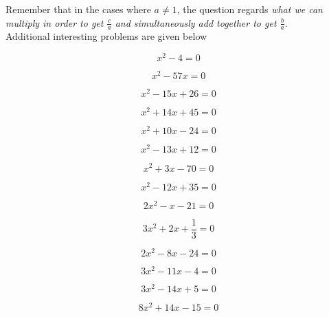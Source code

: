 \documentclass[a4paper]{article}
\begin{document}
Remember that in the cases where $a \neq 1$, the question regards \emph{what we can multiply in order to get $\frac{c}{a}$ and simultaneously add together to get $\frac{b}{a}$}.
\\Additional interesting problems are given below

\begin{equation}
	x^2 - 4 = 0
\end{equation}

\begin{equation}
	x^2 - 57x = 0
\end{equation}

\begin{equation}
	x^2 - 15x +26 = 0
\end{equation}

\begin{equation}
	x^2 + 14x +45 = 0
\end{equation}

\begin{equation}
	x^2 + 10x -24 = 0
\end{equation}

\begin{equation}
	x^2 - 13x +12 = 0
\end{equation}

\begin{equation}
	x^2 + 3x -70 = 0
\end{equation}

\begin{equation}
	x^2 -12x +35 = 0
\end{equation}

\begin{equation}
	2x^2 -x -21 = 0
\end{equation}

\begin{equation}  \label{eq:ex5}
	3x^2 + 2x + \frac{1}{3} = 0
\end{equation}

\begin{equation}
	2x^2 -8x -24 = 0
\end{equation}

\begin{equation}
	3x^2 -11x -4 = 0
\end{equation}

\begin{equation}
	3x^2 -14x +5 = 0
\end{equation}

\begin{equation}
	8x^2 +14x -15 = 0
\end{equation}
\end{document}
